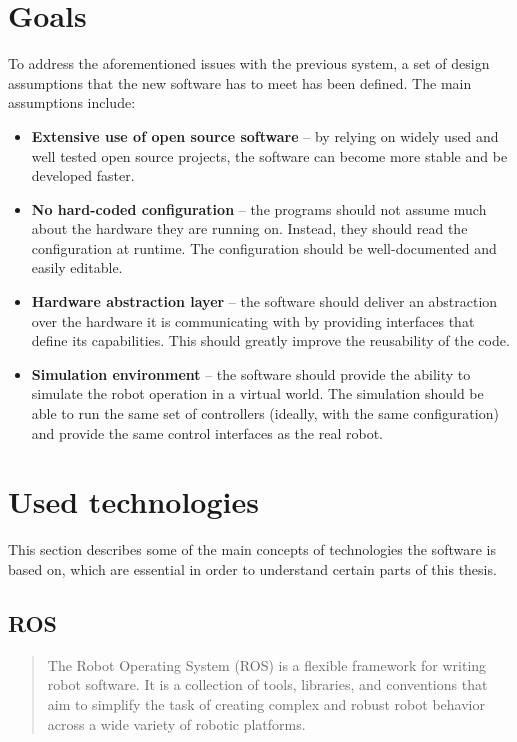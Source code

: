 \documentclass[english,inz,shortabstract]{iithesis}
\begin{document}
\section{Goals} \label{goals}
To address the aforementioned issues with the previous system, a set of design assumptions that the new software has to meet has been defined. The main assumptions include:

\begin{itemize}
	\item \textbf{Extensive use of open source software} -- by relying on widely used and well tested open source projects, the software can become more stable and be developed faster.
	\item \textbf{No hard-coded configuration} -- the programs should not assume much about the hardware they are running on. Instead, they should read the configuration at runtime. The configuration should be well-documented and easily editable.
	\item \textbf{Hardware abstraction layer} -- the software should deliver an abstraction over the hardware it is communicating with by providing interfaces that define its capabilities. This should greatly improve the reusability of the code. 
	\item \textbf{Simulation environment} -- the software should provide the ability to simulate the robot operation in a virtual world. The simulation should be able to run the same set of controllers (ideally, with the same configuration) and provide the same control interfaces as the real robot.
\end{itemize}


\section{Used technologies}
This section describes some of the main concepts of technologies the software is based on, which are essential in order to understand certain parts of this thesis.

	\subsection{ROS}
	\begin{quote}
		The Robot Operating System (ROS) is a flexible framework for writing robot software. It is a collection of tools, libraries, and conventions that aim to simplify the task of creating complex and robust robot behavior across a wide variety of robotic platforms.
		\cite{ros:about}
	\end{quote}
\end{document}
